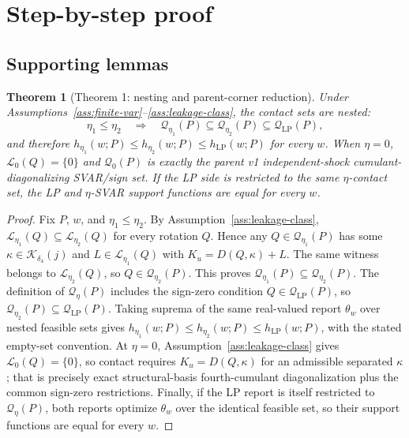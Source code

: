 \documentclass[11pt]{article}
\theoremstyle{definition}
\theoremstyle{plain}
\newtheorem{theorem}{Theorem}
\theoremstyle{remark}
\begin{document}
\section{Step-by-step proof}
\subsection*{Supporting lemmas}
\begin{theorem}[Theorem 1: nesting and parent-corner reduction]\label{thm:parent-corner}
Under Assumptions~\ref{ass:finite-var}--\ref{ass:leakage-class}, the contact sets are nested:
\[
\eta_1\le\eta_2\quad\Longrightarrow\quad
\mathcal Q_{\eta_1}(P)\subseteq \mathcal Q_{\eta_2}(P)\subseteq\mathcal Q_{\mathrm{LP}}(P),
\]
and therefore \(h_{\eta_1}(w;P)\le h_{\eta_2}(w;P)\le h_{\mathrm{LP}}(w;P)\) for every \(w\).  When \(\eta=0\), \(\mathcal L_0(Q)=\{0\}\) and \(\mathcal Q_0(P)\) is exactly the parent v1 independent-shock cumulant-diagonalizing SVAR/sign set.  If the LP side is restricted to the same \(\eta\)-contact set, the LP and \(\eta\)-SVAR support functions are equal for every \(w\).
\end{theorem}
\begin{proof}
Fix \(P\), \(w\), and \(\eta_1\le\eta_2\).  By Assumption~\ref{ass:leakage-class}, \(\mathcal L_{\eta_1}(Q)\subseteq\mathcal L_{\eta_2}(Q)\) for every rotation \(Q\).  Hence any \(Q\in\mathcal Q_{\eta_1}(P)\) has some \(\kappa\in\mathcal K_{\delta_4}(j)\) and \(L\in\mathcal L_{\eta_1}(Q)\) with \(K_u=D(Q,\kappa)+L\).  The same witness belongs to \(\mathcal L_{\eta_2}(Q)\), so \(Q\in\mathcal Q_{\eta_2}(P)\).  This proves \(\mathcal Q_{\eta_1}(P)\subseteq\mathcal Q_{\eta_2}(P)\).  The definition of \(\mathcal Q_\eta(P)\) includes the sign-zero condition \(Q\in\mathcal Q_{\mathrm{LP}}(P)\), so \(\mathcal Q_{\eta_2}(P)\subseteq\mathcal Q_{\mathrm{LP}}(P)\).  Taking suprema of the same real-valued report \(\theta_w\) over nested feasible sets gives \(h_{\eta_1}(w;P)\le h_{\eta_2}(w;P)\le h_{\mathrm{LP}}(w;P)\), with the stated empty-set convention.  At \(\eta=0\), Assumption~\ref{ass:leakage-class} gives \(\mathcal L_0(Q)=\{0\}\), so contact requires \(K_u=D(Q,\kappa)\) for an admissible separated \(\kappa\); that is precisely exact structural-basis fourth-cumulant diagonalization plus the common sign-zero restrictions.  Finally, if the LP report is itself restricted to \(\mathcal Q_\eta(P)\), both reports optimize \(\theta_w\) over the identical feasible set, so their support functions are equal for every \(w\).
\end{proof}
\end{document}
